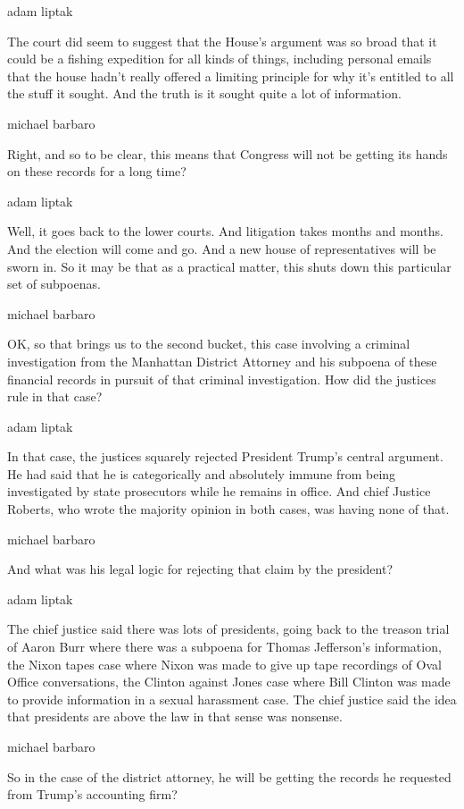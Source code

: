adam liptak

The court did seem to suggest that the House's argument was so broad
that it could be a fishing expedition for all kinds of things, including
personal emails that the house hadn't really offered a limiting
principle for why it's entitled to all the stuff it sought. And the
truth is it sought quite a lot of information.

michael barbaro

Right, and so to be clear, this means that Congress will not be getting
its hands on these records for a long time?

adam liptak

Well, it goes back to the lower courts. And litigation takes months and
months. And the election will come and go. And a new house of
representatives will be sworn in. So it may be that as a practical
matter, this shuts down this particular set of subpoenas.

michael barbaro

OK, so that brings us to the second bucket, this case involving a
criminal investigation from the Manhattan District Attorney and his
subpoena of these financial records in pursuit of that criminal
investigation. How did the justices rule in that case?

adam liptak

In that case, the justices squarely rejected President Trump's central
argument. He had said that he is categorically and absolutely immune
from being investigated by state prosecutors while he remains in office.
And chief Justice Roberts, who wrote the majority opinion in both cases,
was having none of that.

michael barbaro

And what was his legal logic for rejecting that claim by the president?

adam liptak

The chief justice said there was lots of presidents, going back to the
treason trial of Aaron Burr where there was a subpoena for Thomas
Jefferson's information, the Nixon tapes case where Nixon was made to
give up tape recordings of Oval Office conversations, the Clinton
against Jones case where Bill Clinton was made to provide information in
a sexual harassment case. The chief justice said the idea that
presidents are above the law in that sense was nonsense.

michael barbaro

So in the case of the district attorney, he will be getting the records
he requested from Trump's accounting firm?

